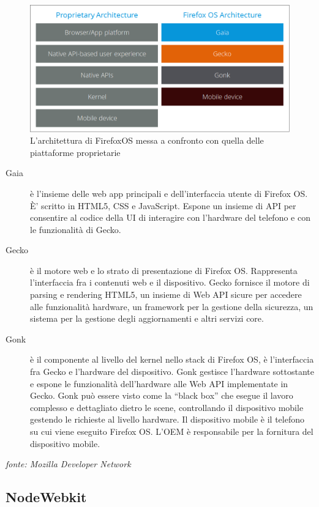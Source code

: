 \begin{figure}[h]
	\begin{center}
		\includegraphics[scale=0.30]{Figures/fxos-general-architecture-match.png}
		\caption[Architettura di FirefoxOS]{L'architettura di FirefoxOS messa a confronto con quella delle piattaforme proprietarie}
		\label{fig:fxos_architecture}
	\end{center}
\end{figure}

\begin{description}
	\item[Gaia] è l'insieme delle web app principali e dell'interfaccia utente di Firefox OS. È' scritto in HTML5, CSS e JavaScript. Espone un insieme di API per consentire al codice della UI di interagire con l'hardware del telefono e con le funzionalità di Gecko.
	\item[Gecko] è il motore web e lo strato di presentazione di Firefox OS. Rappresenta l'interfaccia fra i contenuti web e il dispositivo. Gecko fornisce il motore di parsing e rendering HTML5, un insieme di Web API sicure per accedere alle funzionalità hardware, un framework per la gestione della sicurezza, un sistema per la gestione degli aggiornamenti e altri servizi core.
	\item[Gonk] è il componente al livello del kernel nello stack di Firefox OS, è l'interfaccia fra Gecko e l'hardware del dispositivo. Gonk gestisce l'hardware sottostante e espone le funzionalità dell'hardware alle Web API implementate in Gecko. Gonk può essere visto come la “black box” che esegue il lavoro complesso e dettagliato dietro le scene, controllando il dispositivo mobile gestendo le richieste al livello hardware.
	Il dispositivo mobile è il telefono su cui viene eseguito Firefox OS. L'OEM è responsabile per la fornitura del dispositivo mobile.
\end{description}
\emph{fonte: Mozilla Developer Network}\cite{mdn:fxos}


\subsection{NodeWebkit}